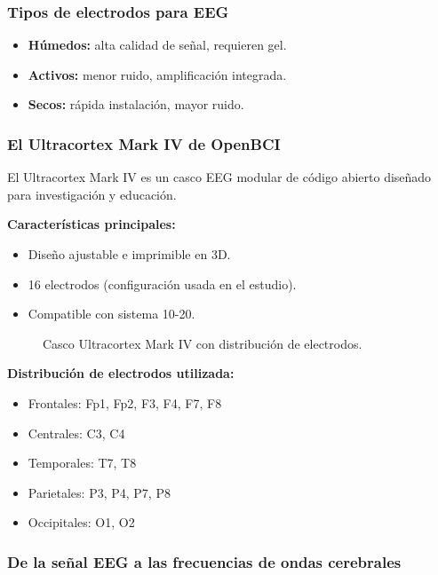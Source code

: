 \documentclass{book}
\begin{document}
\subsubsection*{Tipos de electrodos para EEG}

\begin{itemize}
    \item \textbf{Húmedos:} alta calidad de señal, requieren gel.
    \item \textbf{Activos:} menor ruido, amplificación integrada.
    \item \textbf{Secos:} rápida instalación, mayor ruido.
\end{itemize}

\subsubsection*{El Ultracortex Mark IV de OpenBCI}

El Ultracortex Mark IV es un casco EEG modular de código abierto diseñado para investigación y educación.

\textbf{Características principales:}
\begin{itemize}
    \item Diseño ajustable e imprimible en 3D.
    \item 16 electrodos (configuración usada en el estudio).
    \item Compatible con sistema 10-20.
\end{itemize}

\begin{figure}[H]
\centering
{}
\caption{Casco Ultracortex Mark IV con distribución de electrodos.}
\label{fig:ultracortex}
\end{figure}

\textbf{Distribución de electrodos utilizada:}
\begin{itemize}
    \item Frontales: Fp1, Fp2, F3, F4, F7, F8
    \item Centrales: C3, C4
    \item Temporales: T7, T8
    \item Parietales: P3, P4, P7, P8
    \item Occipitales: O1, O2
\end{itemize}

\subsubsection*{De la señal EEG a las frecuencias de ondas cerebrales}
\end{document}
